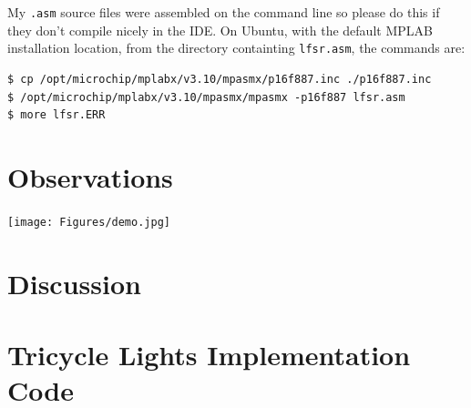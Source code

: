 \documentclass[11pt]{article}
\begin{document}
My \texttt{.asm} source files were assembled on the command line so
please do this if they don't compile nicely in the IDE.
On Ubuntu, with the default MPLAB installation location, 
from the directory containting \texttt{lfsr.asm}, the commands are:
\begin{verbatim}
$ cp /opt/microchip/mplabx/v3.10/mpasmx/p16f887.inc ./p16f887.inc
$ /opt/microchip/mplabx/v3.10/mpasmx/mpasmx -p16f887 lfsr.asm
$ more lfsr.ERR
\end{verbatim}

\section{Observations}

\begin{center}
	\texttt{[image: Figures/demo.jpg]}
	\label{tricycle-lights-jpg}
\end{center}

\section{Discussion}

\clearpage

\section{Tricycle Lights Implementation Code}
\label{implementation-code}


\end{document}
